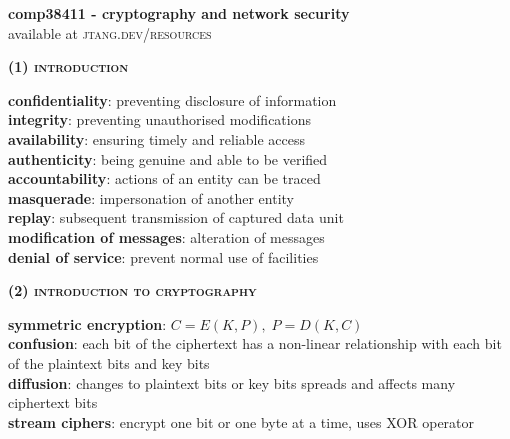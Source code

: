 \documentclass[a4paper]{article}
\begin{document}
	
\begin{center}
	\huge{\textbf{comp38411 - cryptography and network security}}\\
	\small{available at \textsc{jtang.dev/resources}}\\
\end{center}

\begin{multicols}{2}

\begin{framed}
	\begin{center}
		\textbf{\textsc{(1) introduction}}
	\end{center}
	
	\noindent
	\textbf{confidentiality}: preventing disclosure of information\\
	\textbf{integrity}: preventing unauthorised modifications\\
	\textbf{availability}: ensuring timely and reliable access\\
	\textbf{authenticity}: being genuine and able to be verified\\
	\textbf{accountability}: actions of an entity can be traced\\
	
	\noindent
	\textbf{masquerade}: impersonation of another entity\\
	\textbf{replay}: subsequent transmission of captured data unit\\
	\textbf{modification of messages}: alteration of messages\\
	\textbf{denial of service}: prevent normal use of facilities
\end{framed}

\begin{framed}
	\begin{center}
		\textbf{\textsc{(2) introduction to cryptography}}
	\end{center}
	
	\noindent
	\textbf{symmetric encryption}: $C = E(K, P), \;P = D(K, C)$\\
	
	\noindent
	\textbf{confusion}: each bit of the ciphertext has a non-linear relationship with each bit of the plaintext bits and key bits\\
	\textbf{diffusion}: changes to plaintext bits or key bits spreads and affects many ciphertext bits\\
	
	\noindent
	\textbf{stream ciphers}: encrypt one bit or one byte at a time, uses XOR operator\\
	

\end{framed}
\end{multicols}
\end{document}
